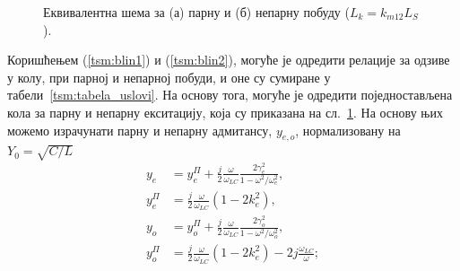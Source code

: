 \begin{figure}[!t]
\centering
{}
\hfil
{}
\caption{Еквивалентна шема за (а) парну и (б) непарну побуду ($L_k=k_{m12}L_S$).}
\label{tsm:sl4}
\end{figure}
Коришћењем (\ref{tsm:blin1}) и (\ref{tsm:blin2}), могуће је одредити релације за одзиве у колу, при парној и непарној побуди, и оне су сумиране у табели~\ref{tsm:tabela_uslovi}. На основу тога, могуће је одредити поједностављена кола за парну и непарну екситацију, која су приказана на сл.~\ref{tsm:sl4}. На основу њих можемо израчунати парну и непарну адмитансу, $y_{e,o}$, нормализовану на $Y_0=\sqrt{C/L}$
\begin{equation}
\begin{aligned}
y_e &= y_e^\Pi + \frac{j}{2}\frac{\omega}{\omega_{LC}}\frac{2\gamma_e^2}{1-\omega^2 / \omega_e^2}, \\
y_e^\Pi &= \frac{j}{2}\frac{\omega}{\omega_{LC}}\left(1 - 2 k_e^2\right), \\
y_o &=  y_o^\Pi + \frac{j}{2}\frac{\omega}{\omega_{LC}}\frac{2\gamma_o^2}{1-\omega^2 / \omega_o^2}, \\
y_o^\Pi &= \frac{j}{2}\frac{\omega}{\omega_{LC}}\left(1 - 2 k_e^2\right) - 2j\frac{\omega_{LC}}{\omega}
;
\end{aligned}
\label{tsm:eo}
\end{equation}
